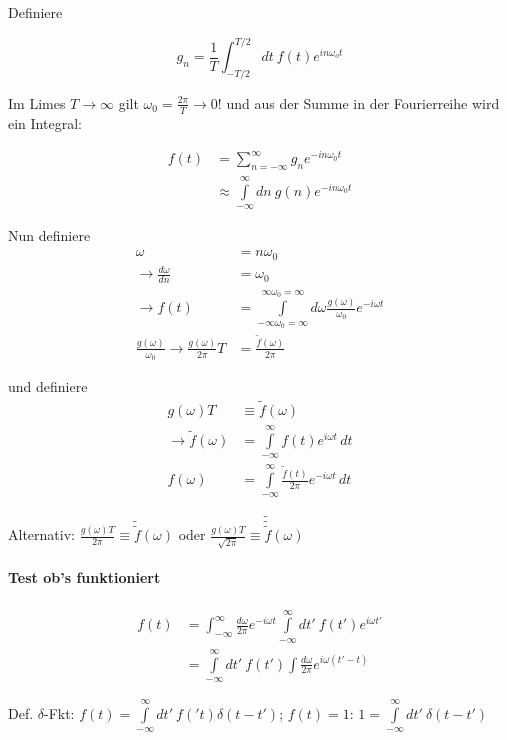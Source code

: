 \documentclass[a4paper,ngerman]{scrbook}
\begin{document}
Definiere

\[
g_n = \frac{1}{T} \int_{-T/2}^{T/2}\! dt\ f(t) e^{in\omega_o t}
\]

Im Limes $T\to \infty$ gilt $\omega_0 = \frac{2\pi}{T} \to 0$! und aus der Summe in der Fourierreihe wird ein Integral:

\begin{align*}
  f(t) &= \sum_{n=-\infty}^\infty g_n e^{-in\omega_0 t}\\
  &\approx \int\limits_{-\infty}^\infty \! dn\ g(n) e^{-in\omega_0 t}
\end{align*}

Nun definiere
\begin{align*}
  \omega &= n\omega_0\\
  \to \frac{d\omega}{dn} &= \omega_0\\
  \to f(t) &=   \int\limits_{-\infty\omega_0 = \infty}^{\infty\omega_0 =     \infty}\! d\omega \frac{g(\omega)}{\omega_0} e^{-i\omega t}\\
\frac{g(\omega)}{\omega_0} \to \frac{g(\omega)}{2\pi}T &= \frac{\tilde{f}(\omega)}{2\pi}
\end{align*}

und definiere
\begin{align*}
  g(\omega)T &\equiv \tilde{f}(\omega)\\
  \to   \tilde{f}(\omega) &= \int\limits_{-\infty}^\infty f(t) e^{i\omega t}\, dt\\
f(\omega) &= \int\limits_{-\infty}^\infty \frac{\tilde{f}(t)}{2\pi} e^{-i\omega t}\, dt
\end{align*}

Alternativ: $\frac{g(\omega)T}{2\pi} \equiv \tilde{\tilde{f}}(\omega)$ oder $\frac{g(\omega)T}{\sqrt{2\pi}} \equiv \tilde{\tilde{\tilde{f}}}(\omega)$

\paragraph{Test ob's funktioniert}

\begin{align*}
  f(t) &= \int_{-\infty}^\infty \! \frac{d\omega}{2\pi} e^{-i\omega t} \int\limits_{-\infty}^{\infty}\! dt'\ f(t') e^{i\omega t'}\\
&= \int\limits_{-\infty}^{\infty}\! dt'\ f(t') \int \frac{d\omega}{2\pi} e^{i\omega(t'-t)}
\end{align*}

Def. $\delta$-Fkt: $f(t) = \int\limits_{-\infty}^{\infty}\! dt'\ f('t) \delta(t-t')$; $f(t) = 1$: $1 = \int\limits_{-\infty}^{\infty}\! dt'\ \delta(t-t')$
\end{document}
